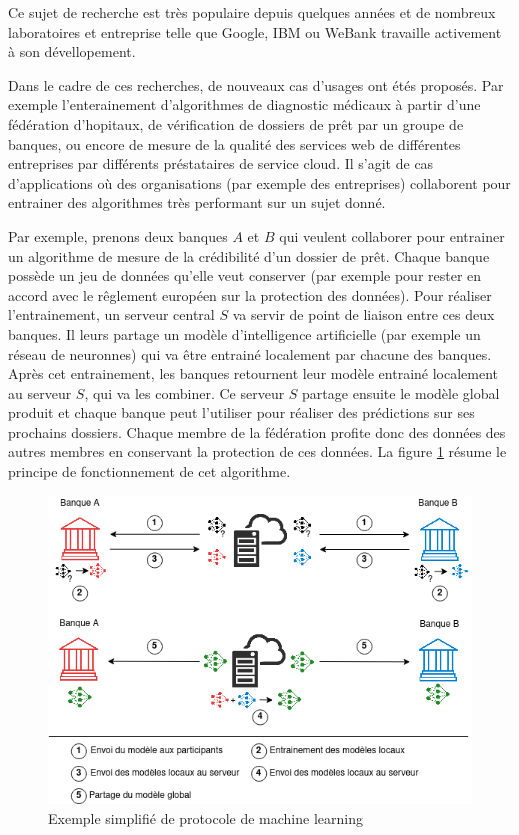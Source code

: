 \documentclass[stage3a]{tnreport} %
\begin{document}
Ce sujet de recherche est très populaire depuis quelques années et de nombreux laboratoires  et entreprise telle que Google, IBM ou WeBank travaille activement à son dévellopement.

Dans le cadre de ces recherches, de nouveaux cas d'usages ont étés proposés.  Par exemple l'enterainement d'algorithmes de diagnostic médicaux à partir d'une fédération d'hopitaux, de vérification de dossiers de prêt par un groupe de banques, ou encore de mesure de la qualité des services web de différentes entreprises par différents préstataires de service cloud. Il s'agit de cas d'applications où des organisations (par exemple des entreprises) collaborent pour entrainer des algorithmes très performant sur un sujet donné.

Par exemple, prenons deux banques $A$ et $B$ qui veulent collaborer pour entrainer un algorithme de mesure de la crédibilité d'un dossier de prêt. Chaque banque possède un jeu de données qu'elle veut conserver (par exemple pour rester en accord avec le rêglement européen sur la protection des données). Pour réaliser l'entrainement, un serveur central $S$ va servir de point de liaison entre ces deux banques. Il leurs partage un modèle d'intelligence artificielle (par exemple un réseau de neuronnes) qui va être entrainé localement par chacune des banques. Après cet entrainement, les banques retournent leur modèle entrainé localement au serveur $S$, qui va les combiner. Ce serveur $S$ partage ensuite le modèle global produit et chaque banque peut l'utiliser pour réaliser des prédictions sur ses prochains dossiers. Chaque membre de la fédération profite donc des données des autres membres en conservant la protection de ces données. La figure \ref{fig:banque_example} résume le principe de fonctionnement de cet algorithme.

\begin{figure}[]
  \centering
  \includegraphics[scale=0.8]{figures/banq.png}
  \caption{Exemple simplifié de protocole de machine learning}
  \label{fig:banque_example}
\end{figure}
\end{document}
